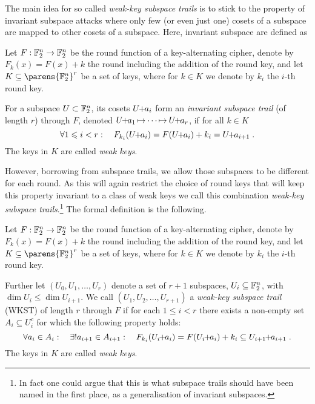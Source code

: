 The main idea for so called \emph{weak-key subspace trails} is to stick to the property of invariant subspace attacks where only few (or even just one) cosets of a subspace are mapped to other cosets of a subspace.
Here, invariant subspace are defined as
\begin{definition}\label{st:def:invariant-subspace}
    Let $F : \mathbb{F}_2^n \to \mathbb{F}_2^n$ be the round function of a key-alternating cipher, denote by $F_k(x) = F(x) + k$ the round including the addition of the round key, and let $K \subseteq \parens{\F_2^n}^r$ be a set of keys, where for $k \in K$ we denote by $k_i$ the $i$-th round key.

    For a subspace $U \subset \mathbb{F}_2^n$, its cosets $U \!\! + \!\! a_i$ form an \emph{invariant subspace trail} (of length $r$) through $F$, denoted $\propIS{\coset{U}{a_1}}{}{}{\propIS{\cdots}{}{}{\coset{U}{a_r}}}$, if for all $k \in K$
    \begin{equation*}
        \forall 1 \leqslant i < r : \quad F_{k_i}(\coset{U}{a_i}) = F(\coset{U}{a_i}) + k_i = \coset{U}{a_{i+1}}\;.
    \end{equation*}
    The keys in $K$ are called \emph{weak keys}.
\end{definition}
However, borrowing from subspace trails, we allow those subspaces to be different for each round.
As this will again restrict the choice of round keys that will keep this property invariant to a class of weak keys we call this combination \emph{weak-key subspace trails}.\footnote{%
    In fact one could argue that this is what subspace trails should have been named in the first place, as a generalisation of invariant subspaces.
}
The formal definition is the following.
\begin{definition}\label{def:wkst}
    Let $F : \mathbb{F}_2^n \to \mathbb{F}_2^n$ be the round function of a key-alternating cipher, denote by $F_k(x) = F(x) + k$ the round including the addition of the round key, and let $K \subseteq \parens{\F_2^n}^r$ be a set of keys, where for $k \in K$ we denote by $k_i$ the $i$-th round key.

    Further let $(U_0, U_1, \ldots , U_{r})$ denote a set of $r + 1$ subspaces, $U_i \subseteq \mathbb{F}_2^n$, with $\dim U_i \leqslant \dim U_{i+1}$.
    We call $(U_1, U_2, \ldots , U_{r+1})$ a \emph{weak-key subspace trail} (WKST) of length $r$ through $F$ if for each $1 \leqslant i < r$ there exists a non-empty set $A_i \subseteq U_i^c$ for which the following property holds:
    \begin{equation*}
        \forall a_i \in A_i : \quad \exists! a_{i+1} \in A_{i+1} : \quad F_{k_i}(\coset{U_i}{a_i}) = F(\coset{U_i}{a_i}) + {k_i} \subseteq \coset{U_{i+1}}{a_{i+1}}\;.
    \end{equation*}
    The keys in $K$ are called \emph{weak keys}.
\end{definition}

